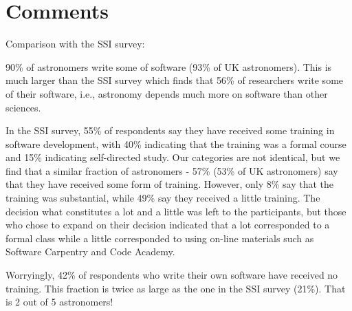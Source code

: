\section{Comments}

Comparison with the SSI survey:

90\% of astronomers write some of software (93\% of UK astronomers). This is much larger than the SSI survey which finds that 56\% of researchers write some of their software, i.e., astronomy depends much more on software than other sciences.

In the SSI survey, 55\% of respondents say they have received some training in software development, with 40\% indicating that the training was a formal course and 15\% indicating self-directed study. Our categories are not identical, but we find that a similar fraction of astronomers - 57\% (53\% of UK astronomers) say that they have received some form of training. However, only 8\% say that the training was substantial, while 49\% say they received a little training. The decision what constitutes a lot and a little was left to the participants, but those who chose to expand on their decision indicated that a lot corresponded to a formal class while a little corresponded to using on-line materials such as Software Carpentry and Code Academy.

Worryingly, 42\% of respondents who write their own software have received no training. This fraction is twice as large as the one in the SSI survey (21\%). That is 2 out of 5 astronomers! 
